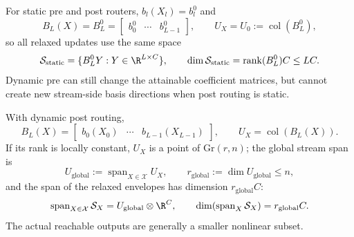 \documentclass{article}
\begin{document}
For static pre and post routers, $b_l(X_l)=b_l^0$ and
\begin{equation}
 B_L(X)=B_L^0=\begin{bmatrix}b_0^0&\cdots&b_{L-1}^0\end{bmatrix},\mspace{36mu}
 U_X=U_0:=\operatorname{col}(B_L^0),
 \label{eq:static-routing-basis}
\end{equation}
so all relaxed updates use the same space
\begin{equation}
 \mathcal S_{\mathrm{static}}=\{B_L^0Y:Y\in\R^{L\times C}\},\mspace{36mu}
 \dim\mathcal S_{\mathrm{static}}=\operatorname{rank}(B_L^0)C\leq LC.
 \label{eq:static-output-space}
\end{equation}
Dynamic pre can still change the attainable coefficient matrices, but cannot
create new stream-side basis directions when post routing is static.

With dynamic post routing,
\begin{equation}
 B_L(X)=\begin{bmatrix}b_0(X_0)&\cdots&b_{L-1}(X_{L-1})\end{bmatrix},\mspace{36mu}
 U_X=\operatorname{col}(B_L(X)).
 \label{eq:dynamic-post-basis}
\end{equation}
If its rank is locally constant, $U_X$ is a point of
$\mathrm{Gr}(r,n)$; the global stream span is
\begin{equation}
 U_{\mathrm{global}}:=\operatorname{span}_{X\in\mathcal X}U_X,\mspace{36mu}
 r_{\mathrm{global}}:=\dim U_{\mathrm{global}}\leq n,
 \label{eq:global-dynamic-stream-space}
\end{equation}
and the span of the relaxed envelopes has dimension $r_{\mathrm{global}}C$:
\begin{equation}
 \operatorname{span}_{X\in\mathcal X}\mathcal S_X
 =U_{\mathrm{global}}\otimes\R^C,\mspace{36mu}
 \dim\!\left(\operatorname{span}_{X}\mathcal S_X\right)=r_{\mathrm{global}}C.
 \label{eq:global-dynamic-output-space}
\end{equation}
The actual reachable outputs are generally a smaller nonlinear subset.
\end{document}
